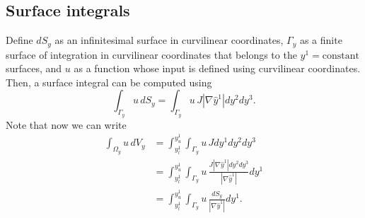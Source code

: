 \documentclass[11pt]{article}
\begin{document}
\subsection{Surface integrals}
Define $d S_y$ as an infinitesimal surface in curvilinear coordinates, $\Gamma_y$ as a finite surface of integration in curvilinear coordinates that belongs to the $y^1 = \text{constant}$ surfaces, and $u$ as a function whose input is defined using curvilinear coordinates. Then, a surface integral can be computed using 
\begin{equation}
    \int_{\Gamma_y} u \, d S_y = \int_{\Gamma_y} u \, J | \nabla \hat{y}^1| dy^2 dy^3.
\end{equation}
Note that now we can write
\begin{align}
\label{eq:int_from_vol_surf}
    \int_{\Omega_y} u \,dV_y &= \int_{y^1_l}^{y^1_u} \int_{\Gamma_y} u \, J dy^1 dy^2 dy^3 \nonumber \\
    &= \int_{y^1_l}^{y^1_u} \int_{\Gamma_y} u \, \frac{J | \nabla \hat{y}^1| dy^2 dy^3}{| \nabla \hat{y}^1 |} dy^1 \nonumber \\
    &= \int_{y^1_l}^{y^1_u} \int_{\Gamma_y} u \, \frac{dS_y}{|\nabla \hat{y}^1|} dy^1.
\end{align}

\end{document}
